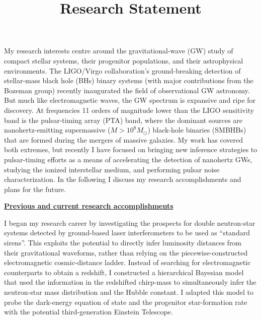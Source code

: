 \documentclass[11pt,letterpaper,sans]{moderncv} %
\title{\huge{Research Statement}}
\begin{document}
\makecvtitle %
\setlength{\parskip}{1.3ex plus 0.5ex minus 0.3ex}
\vspace{-12mm}

\noindent My research interests centre around the gravitational-wave (GW) study of compact stellar systems, their progenitor populations, and their astrophysical environments. The LIGO/Virgo collaboration's ground-breaking detection of stellar-mass black hole (BHs) binary systems (with major contributions from the Bozeman group) recently inaugurated the field of observational GW astronomy. But much like electromagnetic waves, the GW spectrum is expansive and ripe for discovery. At frequencies 11 orders of magnitude lower than the LIGO sensitivity band is the pulsar-timing array (PTA) band, where the dominant sources are nanohertz-emitting supermassive ($M > 10^8M_\odot$) black-hole binaries (SMBHBs) that are formed during the mergers of massive galaxies. My work has covered both extremes, but recently I have focused on bringing new inference strategies to pulsar-timing efforts as a means of accelerating the detection of nanohertz GWs, studying the ionized interstellar medium, and performing pulsar noise characterization. In the following I discuss my research accomplishments and plans for the future.

\noindent \textbf{\underline{Previous and current research accomplishments}}

\noindent I began my research career by investigating the prospects for double neutron-star systems detected by ground-based laser interferometers to be used as ``standard sirens''. This exploits the potential to directly infer luminosity distances from their gravitational waveforms, rather than relying on the piecewise-constructed electromagnetic cosmic-distance ladder. Instead of searching for electromagnetic counterparts to obtain a redshift, I constructed a hierarchical Bayesian model that used the information in the redshifted chirp-mass to simultaneously infer the neutron-star mass distribution and the Hubble constant. %
I adapted this model to probe the dark-energy equation of state and the progenitor star-formation rate with the potential third-generation Einstein Telescope.
\end{document}
